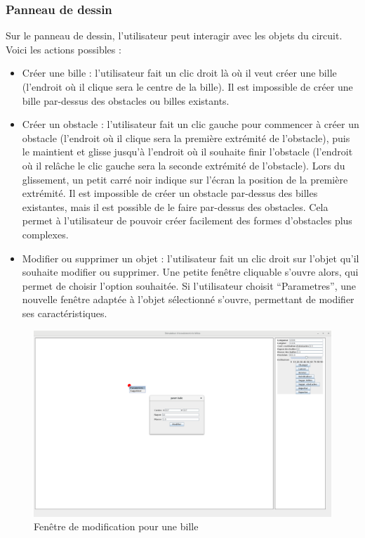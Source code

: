 \documentclass{report}
\begin{document}
\newpage
\subsubsection{Panneau de dessin}

Sur le panneau de dessin, l’utilisateur peut interagir avec les objets du circuit. \\

Voici les actions possibles :
\begin{itemize}
\item Créer une bille : l’utilisateur fait un clic droit là où il veut créer une bille (l’endroit où il clique sera le centre de la bille). Il est impossible de créer une bille par-dessus des obstacles ou billes existants.
\item Créer un obstacle : l’utilisateur fait un clic gauche pour commencer à créer un obstacle (l’endroit où il clique sera la première extrémité de l’obstacle), puis le maintient et glisse jusqu’à l’endroit où il souhaite finir l’obstacle (l’endroit où il relâche le clic gauche sera la seconde extrémité de l’obstacle). Lors du glissement, un petit carré noir indique sur l’écran la position de la première extrémité. Il est impossible de créer un obstacle par-dessus des billes existantes, mais il est possible de le faire par-dessus des obstacles. Cela permet à l’utilisateur de pouvoir créer facilement des formes d’obstacles plus complexes.
\item Modifier ou supprimer un objet : l’utilisateur fait un clic droit sur l’objet qu’il souhaite modifier ou supprimer. Une petite fenêtre cliquable s’ouvre alors, qui permet de choisir l’option souhaitée. Si l’utilisateur choisit “Parametres”, une nouvelle fenêtre adaptée à l’objet sélectionné s’ouvre, permettant de modifier ses caractéristiques.
\end{itemize}

\begin{figure}[H]
\centering
\includegraphics[scale=0.25]{modifier_bille.png}
\caption{Fenêtre de modification pour une bille}
\end{figure}
\end{document}
